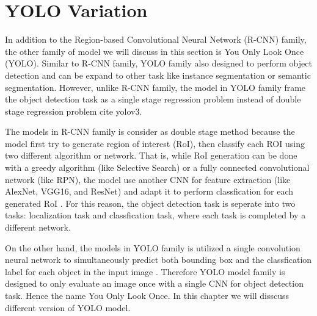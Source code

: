 \chapter{YOLO Variation} \label{chap:yolo_variation}

In addition to the Region-based Convolutional Neural Network (R-CNN) family, the other family of model we will discuss in this section is You Only Look Once (YOLO). Similar to R-CNN family, YOLO family also designed to perform object detection and can be expand to other task like instance segmentation or semantic segmentation. However, unlike R-CNN family, the model in YOLO family frame the object detection task as a single stage regression problem instead of double stage regression problem {\color{red} cite yolov3}. 

The models in R-CNN family is consider as double stage method because the model first try to generate region of interest (RoI), then classify each ROI using two different algorithm or network. That is, while RoI generation can be done with a greedy algorithm (like Selective Search) or a fully connected convolutional network (like RPN), the model use another CNN for feature extraction (like AlexNet, VGG16, and ResNet) and adapt it to perform classfication for each generated RoI \cite{Girshick_R_CNN_2013, fast_rcnn_og, faster_rcnn_2015}. For this reason, the object detection task is seperate into two tasks: localization task and classfication task, where each task is completed by a different network.

On the other hand, the models in YOLO family is utilized a single convolution neural network to simultaneously predict both bounding box and the classfication label for each object in the input image \cite{yolov1_2016}. Therefore YOLO model family is designed to only evaluate an image once with a single CNN for object detection task. Hence the name You Only Look Once. In this chapter we will disscuss different version of YOLO model.







